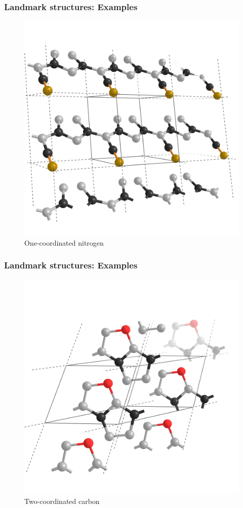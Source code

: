 \documentclass{beamer}
\begin{document}
\begin{frame}
  \frametitle{Landmark structures: Examples}
    \begin{figure}[h!]
    \includegraphics[scale=0.19]{Figures/landmark2.png}
    \caption{One-coordinated nitrogen}
    \label{fig:const} 
  \end{figure}
\end{frame}

\begin{frame}
  \frametitle{Landmark structures: Examples}
    \begin{figure}[h!]
    \includegraphics[scale=0.19]{Figures/landmark3.png}
    \caption{Two-coordinated carbon}
    \label{fig:const} 
  \end{figure}
\end{frame}
\end{document}
